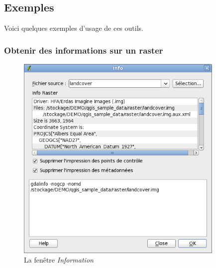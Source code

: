 {%
\subsection{Exemples}\label{gdal_exemples}
Voici quelques exemples d'usage de ces outils.

\subsubsection{Obtenir des informations sur un raster}
\begin{figure}[ht]
   \centering
   \caption{La fenêtre \emph{Information} \nixcaption}\label{gdalinfo}
   \includegraphics[clip=true, width=10cm]{plugins_gdaltools_images/gdalinfo}
\end{figure}

}

